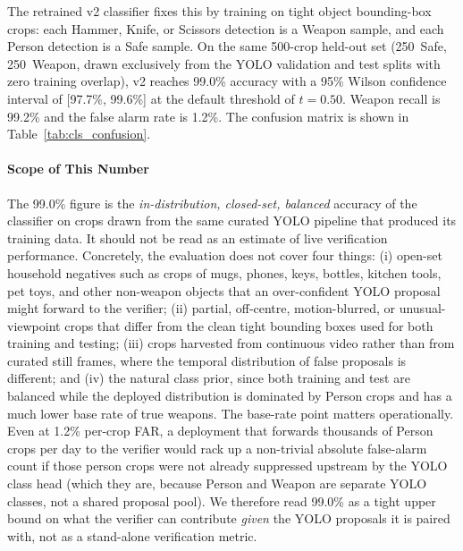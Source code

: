 \documentclass{ieeeaccess}
\begin{document}
The retrained v2 classifier fixes this by training on tight object bounding-box crops: each Hammer, Knife, or Scissors detection is a Weapon sample, and each Person detection is a Safe sample. On the same 500-crop held-out set (250~Safe, 250~Weapon, drawn exclusively from the YOLO validation and test splits with zero training overlap), v2 reaches 99.0\% accuracy with a 95\% Wilson confidence interval of [97.7\%, 99.6\%] at the default threshold of $t{=}0.50$. Weapon recall is 99.2\% and the false alarm rate is 1.2\%. The confusion matrix is shown in Table~\ref{tab:cls_confusion}.

\paragraph*{Scope of This Number}
The 99.0\% figure is the \emph{in-distribution, closed-set, balanced} accuracy of the classifier on crops drawn from the same curated YOLO pipeline that produced its training data. It should not be read as an estimate of live verification performance. Concretely, the evaluation does not cover four things: (i) open-set household negatives such as crops of mugs, phones, keys, bottles, kitchen tools, pet toys, and other non-weapon objects that an over-confident YOLO proposal might forward to the verifier; (ii) partial, off-centre, motion-blurred, or unusual-viewpoint crops that differ from the clean tight bounding boxes used for both training and testing; (iii) crops harvested from continuous video rather than from curated still frames, where the temporal distribution of false proposals is different; and (iv) the natural class prior, since both training and test are balanced while the deployed distribution is dominated by Person crops and has a much lower base rate of true weapons. The base-rate point matters operationally. Even at 1.2\% per-crop FAR, a deployment that forwards thousands of Person crops per day to the verifier would rack up a non-trivial absolute false-alarm count if those person crops were not already suppressed upstream by the YOLO class head (which they are, because Person and Weapon are separate YOLO classes, not a shared proposal pool). We therefore read 99.0\% as a tight upper bound on what the verifier can contribute \emph{given} the YOLO proposals it is paired with, not as a stand-alone verification metric.
\end{document}
